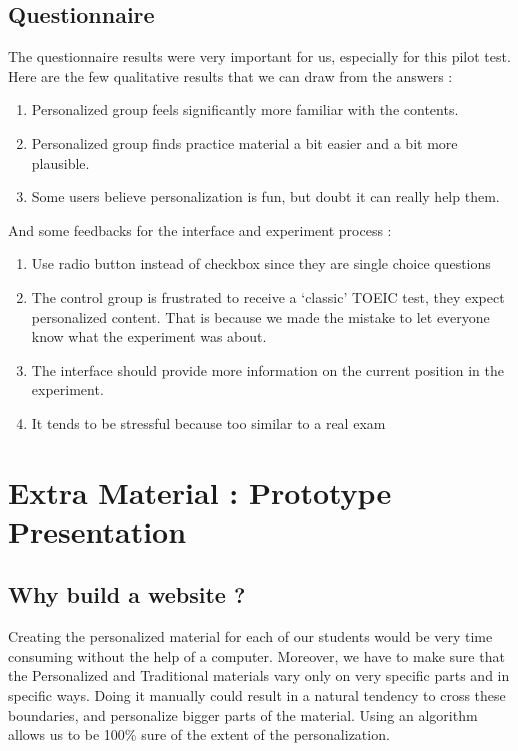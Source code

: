 \documentclass[a4paper,12pt]{article}
\begin{document}
\subsection{Questionnaire}

The questionnaire results were very important for us, especially for this pilot test. Here are the few qualitative results that we can draw from the answers :

\begin{enumerate}
\item Personalized group feels significantly more familiar with the contents.
\item Personalized group finds practice material a bit easier and a bit more plausible.
\item Some users believe personalization is fun, but doubt it can really help them.
\end{enumerate}

\noindent
And some feedbacks for the interface and experiment process :

\begin{enumerate}
\item Use radio button instead of checkbox since they are single choice questions
\item The control group is frustrated to receive a `classic' TOEIC test, they expect personalized content. That is because we made the mistake to let everyone know what the experiment was about.
\item The interface should provide more information on the current position in the experiment.
\item It tends to be stressful because too similar to a real exam
\end{enumerate}

\section{Extra Material : Prototype Presentation}

\subsection{Why build a website ?}

Creating the personalized material for each of our students would be very time consuming without the help of a computer. Moreover, we have to make sure that the Personalized and Traditional materials vary only on very specific parts and in specific ways. Doing it manually could result in a natural tendency to cross these boundaries, and personalize bigger parts of the material. Using an algorithm allows us to be 100\% sure of the extent of the personalization.
\end{document}
